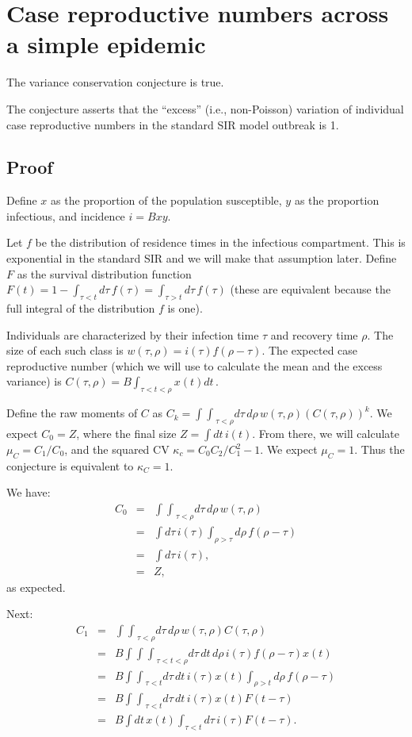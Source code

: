 \documentclass[11pt]{article}
\newcommand{\dt}{dt\,}
\newcommand{\dtau}{d\tau\,}
\newcommand{\drho}{d\rho\,}
\newcommand{\intint}{{\int\!\!\int}}
\newcommand{\intintint}{{\int\!\!\int\!\!\int}}
\newcommand{\eqlab}[1]{\label{eq:#1}}
\begin{document}
\section*{Case reproductive numbers across a simple epidemic}

The variance conservation conjecture is true.

The conjecture asserts that the “excess” (i.e., non-Poisson) variation of individual case reproductive numbers in the standard SIR model outbreak is 1.

\subsection*{Proof}
Define $x$ as the proportion of the population susceptible, $y$ as the proportion infectious, and incidence $i = Bxy$.

Let $f$ be the distribution of residence times in the infectious compartment. This is exponential in the standard SIR and we will make that assumption later. Define $F$ as the survival distribution function
$F(t)
	= 1 -\int_{\tau<t} \dtau f(\tau)
	= \int_{\tau>t} \dtau f(\tau)
$ (these are equivalent because the full integral of the distribution $f$ is one).

Individuals are characterized by their infection time $\tau$ and recovery time $\rho$. The size of each such class is $w(\tau, \rho) = i(\tau) f(\rho-\tau)$. The expected case reproductive number (which we will use to calculate the mean and the excess variance) is $C(\tau, \rho) = B \int_{\tau<t<\rho} x(t) \dt$.

Define the raw moments of $C$ as $C_k = \intint_{\tau<\rho} \dtau\drho w(\tau, \rho) (C(\tau, \rho))^k$.
We expect $C_0=Z$, where the final size $Z = \int\dt i(t)$. From there, we will calculate $\mu_C = C_1/C_0$, and the squared CV $\kappa_c = C_0C_2/C_1^2-1$. We expect $\mu_C=1$. Thus the conjecture is equivalent to $\kappa_C = 1$.

We have:
\begin{eqnarray}
	C_0
	&=& \intint_{\tau<\rho} \dtau\drho w(\tau, \rho)
	\\ &=& \int \dtau i(\tau) \int_{\rho>\tau} \drho f(\rho-\tau)
	\\ &=& \int \dtau i(\tau),
	\\ &=& Z,
\end{eqnarray}
as expected.

Next:
\begin{eqnarray}
	C_1
	&=& \intint_{\tau<\rho} \dtau\drho w(\tau, \rho) C(\tau, \rho)
	\\ &=& B \intintint_{\tau<t<\rho} \dtau\dt\drho
		i(\tau) f(\rho-\tau) x(t)
	\\ &=& B \intint_{\tau<t} \dtau\dt i(\tau) x(t)
		\int_{\rho>t} \drho f(\rho-\tau)
	\\ &=& B \intint_{\tau<t} \dtau\dt i(\tau) x(t) F(t-\tau)
	\\ &=& B \int \dt x(t) \int_{\tau<t}\dtau i(\tau) F(t-\tau).
	\eqlab{C1pre}
\end{eqnarray}
\end{document}
